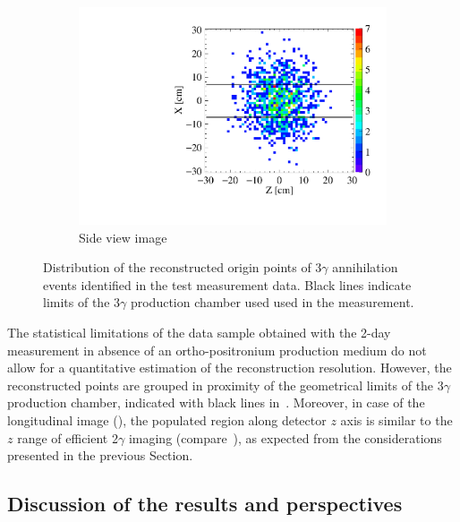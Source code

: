 \begin{figure}[h!]
  \begin{subfigure}{0.45\textwidth}
  \includegraphics[width=1.0\textwidth]{Chapter8_analysis_jpet/img/3g_xz_all}
  \caption{Side view image}\label{fig:3g_image_b}
\end{subfigure}
\caption{Distribution of the reconstructed origin points of 3$\gamma$ annihilation events identified in the test measurement data. Black lines indicate limits of the 3$\gamma$ production chamber used used in the measurement.}\label{fig:3g_image}
\end{figure}

The statistical limitations of the data sample obtained with the 2-day measurement in absence of an ortho-positronium production medium do not allow for a quantitative estimation of the reconstruction resolution. However, the reconstructed points are grouped in proximity of the geometrical limits of the 3$\gamma$ production chamber, indicated with black lines in~. Moreover, in case of the longitudinal image (), the populated region along detector $z$ axis is similar to the $z$ range of efficient 2$\gamma$ imaging (compare~), as expected from the considerations presented in the previous Section.

\subsection{Discussion of the results and perspectives}
\label{sec:jpet_discussion_perspectives}

